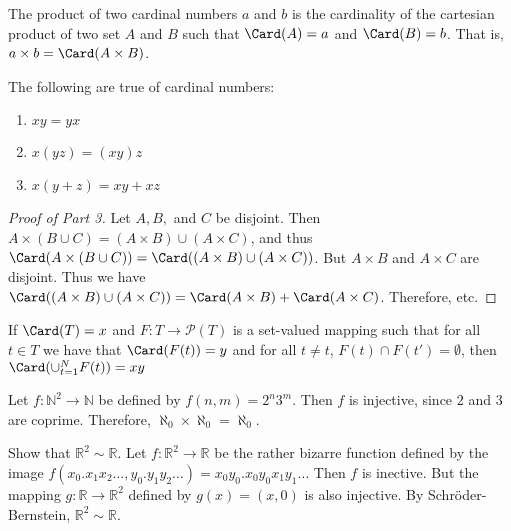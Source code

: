     \begin{definition}
        The product of two cardinal numbers $a$ and $b$ is the cardinality of
        the cartesian product of two set $A$ and $B$ such that $\Card(A)=a$ and
        $\Card(B)=b$. That is, ${a}\times{b}=\Card({A}\times{B})$.
    \end{definition}
    \begin{theorem}
        The following are true of cardinal numbers:
        \begin{enumerate}
            \item $xy=yx$
            \item $x(yz)=(xy)z$
            \item $x(y+z)=xy+xz$
        \end{enumerate}
    \end{theorem}
    \begin{proof}[Proof of Part 3]
        Let $A,B,$ and $C$ be disjoint.
        Then
        ${A}\times{({B}\cup{C})}%
         =({A}\times{B})\cup({A}\times{C})$, and thus
        $\Card({A}\times{({B}\cup{C})})%
         =\Card(({A}\times{B})\cup({A}\times{C}))$.
        But ${A}\times{B}$ and ${A}\times{C}$ are disjoint.
        Thus we have
        $\Card(({A}\times{B})\cup({A}\times{C}))%
         =\Card({A}\times{B})+\Card({A}\times{C})$.
        Therefore, etc.
    \end{proof}
    \begin{theorem}
        If $\Card(T)=x$ and $F:{T}\rightarrow{\mathcal{P}(T)}$ is a
        set-valued mapping such that for all ${t}\in{T}$ we have that
        $\Card(F(t))=y$ and for all ${t}\ne{t}$,
        ${F(t)}\cap{F(t')}=\emptyset$, then $\Card(\cup_{t=1}^{N}F(t))=xy$
    \end{theorem}
    \begin{example}
        Let $f:{\mathbb{N}^{2}}\rightarrow{\mathbb{N}}$
        be defined by $f(n,m)=2^{n}3^{m}$.
        Then $f$ is injective, since $2$ and $3$
        are coprime. Therefore,
        $\aleph_{0}\times\aleph_{0}=\aleph_{0}$.
    \end{example}
    \begin{example}
        Show that $\mathbb{R}^{2}\sim\mathbb{R}$.
        Let $f:\mathbb{R}^{2}\rightarrow\mathbb{R}$
        be the rather bizarre function defined by the image
        $f(x_{0}.x_{1}x_{2}\hdots,y_{0}.y_{1}y_{2}\hdots)%
         =x_{0}y_{0}.x_{0}y_{0}x_{1}y_{1}\hdots$ Then
        $f$ is inective. But the mapping
        $g:\mathbb{R}\rightarrow\mathbb{R}^{2}$
        defined by $g(x)=(x,0)$ is also injective.
        By Schr\"{o}der-Bernstein,
        $\mathbb{R}^{2}\sim\mathbb{R}$.
    \end{example}
